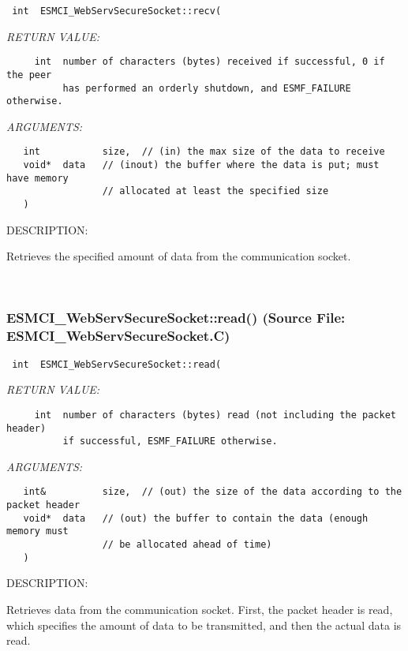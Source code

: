   
\begin{verbatim} int  ESMCI_WebServSecureSocket::recv(\end{verbatim}{\em RETURN VALUE:}
\begin{verbatim}     int  number of characters (bytes) received if successful, 0 if the peer
          has performed an orderly shutdown, and ESMF_FAILURE otherwise.\end{verbatim}{\em ARGUMENTS:}
\begin{verbatim}   int           size,  // (in) the max size of the data to receive
   void*  data   // (inout) the buffer where the data is put; must have memory
                 // allocated at least the specified size
   )\end{verbatim}
{\sf DESCRIPTION:\\ }


      Retrieves the specified amount of data from the communication socket.
   
 
\mbox{}\hrulefill\
 
\subsubsection{ESMCI\_WebServSecureSocket::read() (Source File: ESMCI\_WebServSecureSocket.C)}


  
\begin{verbatim} int  ESMCI_WebServSecureSocket::read(\end{verbatim}{\em RETURN VALUE:}
\begin{verbatim}     int  number of characters (bytes) read (not including the packet header)
          if successful, ESMF_FAILURE otherwise.\end{verbatim}{\em ARGUMENTS:}
\begin{verbatim}   int&          size,  // (out) the size of the data according to the packet header
   void*  data   // (out) the buffer to contain the data (enough memory must
                 // be allocated ahead of time)
   )\end{verbatim}
{\sf DESCRIPTION:\\ }


      Retrieves data from the communication socket.  First, the packet header
      is read, which specifies the amount of data to be transmitted, and then
      the actual data is read.
   
